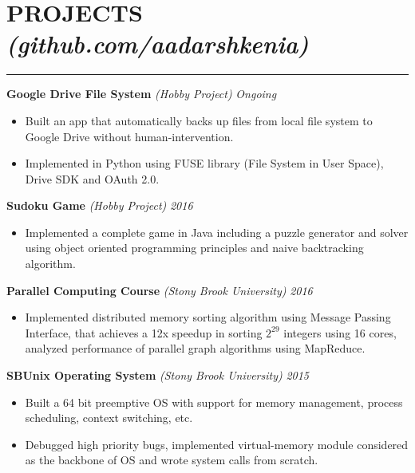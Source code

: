 \documentclass[12pt]{article}
\newcommand{\sectionHeadingWithLink}[2]{
\vspace{-15pt}
\section*{\small{#1 \textit{#2}}}
\vspace{-10pt}
\hrule
\vspace{8pt}
}
\newcommand {\projectSectionSubheading}[4]{
    \noindent \small{\textbf{#1} \textit{(#2)} : #3  \hfill \textit{#4}} \\
    \vspace{-10pt}
}
\newcommand {\projectSectionSubheadingAlternate}[3]{
    \noindent \small{\textbf{#1} \textit{(#2)} \hfill \textit{#3}} \\
    \vspace{-22pt}
}
\newcommand{\sectionListStart}{
    \begin{itemize}[label={\small{\textbullet}}, leftmargin=20pt] %
}
\newcommand{\sectionListEnd}{\end{itemize} \vspace{0pt}}
\newcommand{\sectionListItem}[1]{\item \small{#1}}
\begin{document}




\sectionHeadingWithLink{PROJECTS}{(github.com/aadarshkenia)}
\projectSectionSubheadingAlternate{Google Drive File System}{Hobby Project}{Ongoing}
\sectionListStart
    \sectionListItem
        Built an app that automatically backs up files from local file system to Google Drive without human-intervention.
    \sectionListItem
        Implemented in Python using FUSE library (File System in User Space), Drive SDK and OAuth 2.0.
\sectionListEnd

\projectSectionSubheadingAlternate{Sudoku Game}{Hobby Project}{2016}
\sectionListStart
    \sectionListItem
        Implemented a complete game in Java including a puzzle generator and solver using object oriented programming principles and naive backtracking algorithm.
\sectionListEnd

\projectSectionSubheadingAlternate{Parallel Computing Course}{Stony Brook University}{2016}
\sectionListStart
    \sectionListItem
        Implemented distributed memory sorting algorithm using Message Passing Interface, that achieves a 12x speedup in sorting $2^{29}$ integers using 16 cores, analyzed performance of parallel graph algorithms using MapReduce.
\sectionListEnd

\projectSectionSubheadingAlternate{SBUnix Operating System}{Stony Brook University}{2015}
\sectionListStart
    \sectionListItem
        Built a 64 bit preemptive OS with support for memory management, process scheduling, context switching, etc. 
    \sectionListItem    
        Debugged high priority bugs, implemented virtual-memory module considered as the backbone of OS and wrote system calls from scratch. 
\sectionListEnd
\end{document}
